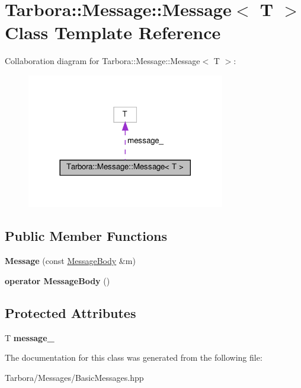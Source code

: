 \hypertarget{classTarbora_1_1Message_1_1Message}{}\section{Tarbora\+:\+:Message\+:\+:Message$<$ T $>$ Class Template Reference}
\label{classTarbora_1_1Message_1_1Message}


Collaboration diagram for Tarbora\+:\+:Message\+:\+:Message$<$ T $>$\+:
\nopagebreak
\begin{figure}[H]
\begin{center}
\leavevmode
\includegraphics[width=245pt]{classTarbora_1_1Message_1_1Message__coll__graph}
\end{center}
\end{figure}
\subsection*{Public Member Functions}
\begin{DoxyCompactItemize}
\item 
\mbox{\label{classTarbora_1_1Message_1_1Message_a0c17b7278a56bc8793de569e5fc386b2}} 
{\bfseries Message} (const \hyperlink{classTarbora_1_1MessageBody}{Message\+Body} \&m)
\item 
\mbox{\label{classTarbora_1_1Message_1_1Message_ae78ff052422996d5f310ca6253c2b0a5}} 
{\bfseries operator Message\+Body} ()
\end{DoxyCompactItemize}
\subsection*{Protected Attributes}
\begin{DoxyCompactItemize}
\item 
\mbox{\label{classTarbora_1_1Message_1_1Message_a31c0ef53411e867f140c66676673c2ab}} 
T {\bfseries message\+\_\+}
\end{DoxyCompactItemize}


The documentation for this class was generated from the following file\+:\begin{DoxyCompactItemize}
\item 
Tarbora/\+Messages/Basic\+Messages.\+hpp\end{DoxyCompactItemize}
